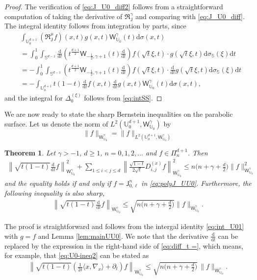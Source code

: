\documentclass{amsart}
\newtheorem{thm}{Theorem}[section]
\theoremstyle{remark}
\def\la{{\langle}}
\def\ra{{\rangle}}
\def\d{\mathrm{d}}
\def\sph{{\mathbb{S}^{d-1}}}
\def\sJ{{\mathsf J}}
\def\sW{{\mathsf W}}
\def\fR{{\mathfrak R}}
\def\g{{\gamma}}
\def\s{\sigma}
\def\la{{\langle}}
\def\ra{{\rangle}}
\def\SS{{\mathbb S}}
\def\UU{{\mathbb U}}
\def\f{\frac}
\begin{document}
\begin{proof}
The verification of \eqref{eq:J_U0_diff2} follows from a straightforward computation of taking the derivative of
$\fR_{\sJ}^\g$ and comparing with \eqref{eq:J_U0_diff}. The integral identity follows from integration by parts, since  
\begin{align*}
&  \int_{\UU_0^{d+1}}  (\fR_{\sJ}^\mu f)(x,t) g(x,t) \sW_{\UU_0}^\g (t) \d \s (x,t) \\
&   = \int_0^1 \int_{\sph} \frac{\d}{\d t} \left(t^{\f {d+1}{2}} \sW_{-\f12, \g+1}(t) \frac{\d}{\d t} \right)f\left(\sqrt{t} \xi,t\right)\cdot
    g\left(\sqrt{t} \xi,t\right) \d \s_\SS(\xi) \d t \\
& = - \int_0^1 \int_{\sph}  \left(t^{\f {d+1}{2}} \sW_{-\f12, \g+1}(t) \frac{\d}{\d t} \right)f\left(\sqrt{t} \xi,t\right)\cdot
    \frac{\d}{\d t} g\left(\sqrt{t} \xi,t\right) \d \s_\SS(\xi) \d t \\
& = - \int_{\UU_0^{d+1}} t(1-t)  \frac{\d}{\d t}f(x,t)\frac{\d}{\d t}g(x,t)  \sW_{\UU_0}^\g (t) \d \s (x,t),
\end{align*}
and the integral for $\Delta_0^{(\xi)}$ follows from \eqref{eq:intSS}. 
\end{proof}

We are now ready to state the sharp Bernstein inequalities on the parabolic surface. Let us denote the norm of
$L^2(\UU_0^{d+1}, \sW_{\UU_0}^\g)$ by 
$$
   \|f \|_{ \sW_{\UU_0}^\g} = \|f\|_{L^2(\UU_0^{d+1},  \sW_{\UU_0}^\g)}
$$

\begin{thm} \label{thm:B-ineqU0J}
Let $\g > -1$, $d \ge 1$, $n = 0,1,2,\ldots$ and $f \in \Pi_n^{d+1}$. Then
\begin{align} \label{eq:U0-ineq1}
 \left\| \sqrt{t(1-t)} \frac{\d}{\d t} f  \right \|_{\sW_{\UU_0}^\g}^2 
    +  \sum_{1\le i<j\le d} \left \| \frac{\sqrt{1-t}}{2 \sqrt{t}} D_{i, j}^{(x)} f \right \|_{ \sW_{\UU_0}^\g}^2  \le 
    n \big( n+\g + \tfrac{d}{2}\big) \|f \|_{ \sW_{\UU_0}^\g}^2 
\end{align} 
and the equality holds if and only if $f = \sJ_{0,\ell}^n$ in \eqref{eq:polyJ_UU0}. 
Furthermore, the following inequality is also sharp, 
\begin{align} \label{eq:U0-ineq2}
 \left\| \sqrt{t(1-t)} \frac{\d}{\d t} f  \right \|_{\sW_{\UU_0}^\g} \le \sqrt{n \big( n+\g + \tfrac{d}{2}\big)}  \|f \|_{ \sW_{\UU_0}^\g}.
\end{align}  
\end{thm}

The proof is straightforward and follows from the intergal identity \eqref{eq:int_U01} with $g = f$ and
Lemma \ref{lem:mainUU0}. We note that the derivative $\frac{\d}{\d t}$ can be replaced by the expression
in the right-hand side of \eqref{eq:diff_t =}, which means, for example, that \eqref{eq:U0-ineq2} can be stated as
\begin{align} \label{eq:U0-ineq3}
\left\| \sqrt{ t (1-t)}\left( \frac{1}{2t} \la x ,\nabla_x\ra +\partial_t \right) f\right \|_{\sW_{\UU_0}^{\g}} 
   \le \sqrt{n \big( n+\g + \tfrac{d}{2}\big)} \, \|f \|_{\sW_{\UU_0}^{\g}}.
\end{align}
\end{document}
